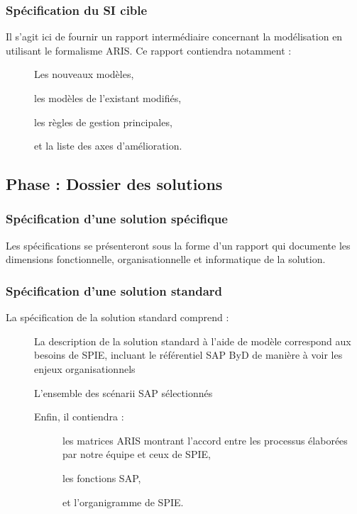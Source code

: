 \subsubsection{Spécification du SI cible}

Il s’agit ici de fournir un rapport intermédiaire concernant la modélisation en utilisant le formalisme ARIS. Ce rapport contiendra notamment : \\
\begin{description}
    \item[\textbullet] Les nouveaux modèles,
    \item[\textbullet] les modèles de l'existant modifiés,
    \item[\textbullet] les règles de gestion principales,
    \item[\textbullet] et la liste des axes d'amélioration.
\end{description}

\subsection{Phase : Dossier des solutions}

\subsubsection{Spécification d’une solution spécifique}

Les spécifications se présenteront sous la forme d’un rapport qui documente les dimensions fonctionnelle, organisationnelle et informatique de la solution.

\subsubsection{Spécification d’une solution standard}

La spécification de la solution standard comprend : \\
\begin{description}
    \item[\textbullet] La description de la solution standard à l’aide de modèle correspond aux besoins de SPIE, incluant le référentiel SAP ByD de manière à voir les enjeux organisationnels
    \item[\textbullet] L’ensemble des scénarii SAP sélectionnés
    \item[\textbullet] Enfin, il contiendra :
        \begin{description}
            \item[\textbullet] les matrices ARIS montrant l’accord entre les processus élaborées par notre équipe et ceux de SPIE,
            \item[\textbullet] les fonctions SAP,
            \item[\textbullet] et l’organigramme de SPIE.
        \end{description}
\end{description}

